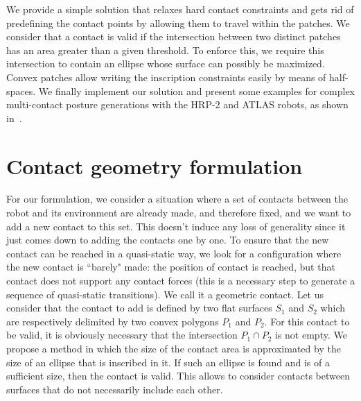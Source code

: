 We provide a simple solution that relaxes hard contact constraints and gets rid of predefining the contact points by allowing them to travel within the patches. We consider that a contact is valid if the intersection between two distinct patches has an area greater than a given threshold. To enforce this, we require this intersection to contain an ellipse whose surface can possibly be maximized. Convex patches allow writing the inscription constraints easily by means of half-spaces. We finally implement our solution and present some examples for complex multi-contact posture generations with the HRP-2 and ATLAS robots, as shown in~. 


\section{Contact geometry formulation}

For our formulation, we consider a situation where a set of contacts between the robot and its environment are already made, and therefore fixed, and we want to add a new contact to this set. This doesn't induce any loss of generality since it just comes down to adding the contacts one by one.
To ensure that the new contact can be reached in a quasi-static way, we look for a configuration where the new contact is ``barely" made: the position of contact is reached, but that contact does not support any contact forces (this is a necessary step to generate a sequence of quasi-static transitions). We call it a geometric contact. Let us consider that the contact to add is defined by two flat surfaces $S_1$ and $S_2$ which are respectively delimited by two convex polygons $P_1$ and $P_2$. For this contact to be valid, it is obviously necessary that the intersection $P_1 \cap P_2$ is not empty. We propose a method in which the size of the contact area is approximated by the size of an ellipse that is inscribed in it. If such an ellipse is found and is of a sufficient size, then the contact is valid. This allows to consider contacts between surfaces that do not necessarily include each other.

